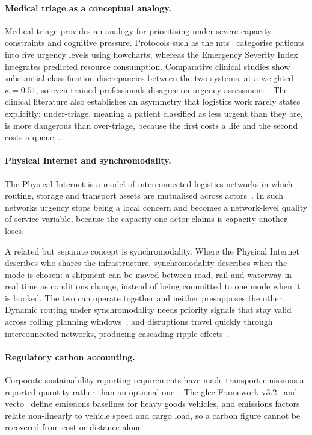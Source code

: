 \paragraph{Medical triage as a conceptual analogy.}
Medical triage provides an analogy for prioritising under severe capacity constraints and
cognitive pressure. Protocols such as the \gls{mts}~\autocite{mackway2013emergency} categorise patients into five urgency levels
using flowcharts, whereas the Emergency Severity Index integrates predicted resource
consumption. Comparative clinical studies show substantial classification discrepancies between the two
systems, at a weighted $\kappa = 0.51$, so even trained professionals disagree on urgency
assessment~\autocite{kuligowski2025comparative}. The clinical literature also establishes an
asymmetry that logistics work rarely states explicitly: under-triage, meaning a patient
classified as less urgent than they are, is more dangerous than over-triage, because the
first costs a life and the second costs a
queue~\autocite{kim2020admission,mackway2013emergency}.

\paragraph{Physical Internet and synchromodality.}
The Physical Internet is a model of interconnected logistics networks in which routing,
storage and transport assets are mutualised across actors~\autocite{montreuil2011toward}. In
such networks urgency stops being a local concern and becomes a network-level quality of
service variable, because the capacity one actor claims is capacity another loses.

A related but separate concept is synchromodality. Where the Physical Internet describes who
shares the infrastructure, synchromodality describes when the mode is chosen: a shipment can
be moved between road, rail and waterway in real time as conditions change, instead of
being committed to one mode when it is booked. The two can operate together and neither
presupposes the other. Dynamic routing under synchromodality needs priority signals that
stay valid across rolling planning windows~\autocite{guo2020dynamic}, and disruptions travel
quickly through interconnected networks, producing cascading ripple
effects~\autocite{li2020exploring}.

\paragraph{Regulatory carbon accounting.}
Corporate sustainability reporting requirements have made transport emissions a reported
quantity rather than an optional one~\autocite{cordova2024green}. The \gls{glec} Framework
v3.2~\autocite{smartfreight2023glec} and \gls{vecto}~\autocite{commission2017vecto} define
emissions baselines for heavy goods vehicles, and emissions factors relate non-linearly to
vehicle speed and cargo load, so a carbon figure cannot be recovered from cost or distance
alone~\autocite{ademe2014impacts}.

